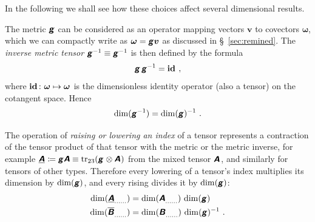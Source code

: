 \documentclass[\ifafour a4paper,12pt,\else a5paper,10pt,\fi%
onecolumn,oneside,article,%
british%
]{memoir}
\makeatletter
\theoremstyle{remark}
\theoremstyle{innote}
\newcommand*{\mathte}[1]{\textbf{\textit{\textsf{#1}}}}
\DeclareMathOperator{\tr}{tr}%
\newcommand*{\defd}{\coloneqq}
\renewcommand*{\|}[1][]{\nonscript\,#1\vert\nonscript\;\mathopen{}}
\newcommand*{\sect}{\S}%
\newcommand*{\q}{}%
\DeclareRobustCommand*{\q}{%
  \mathord{\mathpalette\bigcdot@{}}%
}
\newcommand*{\bigcdot@scalefactor}{0.7}
\newcommand*{\bigcdot@widthfactor}{1.5}
\newcommand*{\bigcdot@}[2]{%
  \sbox0{$#1\vcenter{}$}%
  \sbox2{$#1\cdot\m@th$}%
  \hbox to \bigcdot@widthfactor\wd2{%
    \hfil
    \raise\ht0\hbox{%
      \scalebox{\bigcdot@scalefactor}{%
        \lower\ht0\hbox{$#1\bullet\m@th$}%
      }%
    }%
    \hfil
  }%
}
\newcommand*{\Un}{\textsf{1}}
\newcommand*{\Le}{\textsf{L}}
\newcommand*{\Ti}{\textsf{T}}
\newcommand*{\yA}{\mathte{A}}
\newcommand*{\yAg}{\underline{\yA}}
\newcommand*{\yB}{\mathte{B}}
\newcommand*{\yBg}{\overline{\yB}}
\newcommand*{\yg}{\mathte{g}}
\newcommand*{\yom}{\bm{\omega}}
\newcommand*{\yv}{\bm{v}}
\renewcommand*{\i}{\indices}
\newcommand*{\id}{\mathbf{id}}%
\makeatother
\begin{document}
In the following we shall see how these choices affect several dimensional
results. %

\medskip

The metric $\yg$ can be considered as an operator mapping vectors $\yv$ to
covectors $\yom$, which we can compactly write as $\yom=\yg\yv$ as
discussed in \sect~\ref{sec:remined}. The \emph{inverse metric tensor}
$\yg^{-1} \equiv \yg\i{^{-1}^{\q\q}}$ is then defined by the formula
\begin{equation}
  \label{eq:inverse_g}
  \yg\,\yg^{-1} = \id\i{_{\q}^{\q}} \ ,
\end{equation}
where $\id\i{_{\q}^{\q}}\colon \yom \mapsto \yom$ is the dimensionless
identity operator (also a tensor) on the cotangent space. Hence
\begin{equation}
  \label{eq:dim_ig}
  \dim(\yg^{-1}) = \dim(\yg)^{-1} \ .
\end{equation}

\medskip

The operation of \emph{raising or lowering an index} of a tensor represents
a contraction of the tensor product of that tensor with the metric or the
metric inverse, for example
$\yAg\i{_{\q\q}} \defd \yg\yA \equiv \tr_{23}(\yg\i{_{\q\q}} \otimes
\yA\i{^{\q}_{\q}})$ from the mixed tensor $\yA\i{^{\q}_{\q}}$, and
similarly for tensors of other types. Therefore every lowering of a
tensor's index multiplies its dimension by $\dim(\yg)$, and every rising
divides it by $\dim(\yg)$:
\begin{equation}
  \label{eq:raising_lowering}
  \begin{split}
  \dim(\yAg\i{_{\dotso}_{\q}_{\dotso}}) &=
  \dim(\yA\i{_{\dotso}^{\q}_{\dotso}})\,\dim(\yg)
\\
  \dim(\yBg\i{_{\dotso}^{\q}_{\dotso}}) &=
  \dim(\yB\i{_{\dotso}_{\q}_{\dotso}})\,\dim(\yg)^{-1} \ .
\end{split}
\end{equation}
\end{document}
